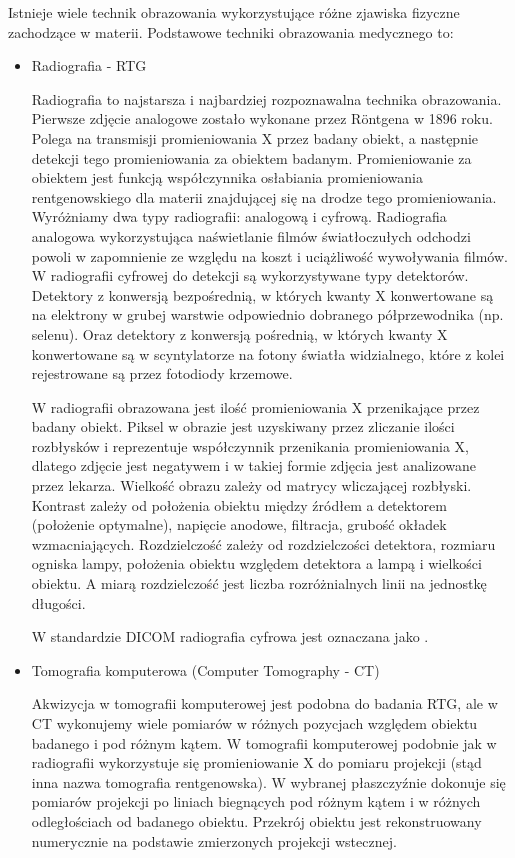 Istnieje wiele technik obrazowania wykorzystujące różne zjawiska fizyczne zachodzące w materii.
Podstawowe techniki obrazowania medycznego to:
\label{sec:basic-imaging-technics}
\begin{itemize}
    \item Radiografia - RTG

          Radiografia to najstarsza i najbardziej rozpoznawalna technika obrazowania.
          Pierwsze zdjęcie analogowe zostało wykonane przez Röntgena w 1896 roku.
          Polega na transmisji promieniowania X przez badany obiekt, a następnie detekcji tego promieniowania za obiektem badanym.
          Promieniowanie za obiektem jest funkcją współczynnika osłabiania promieniowania rentgenowskiego dla materii znajdującej się na drodze tego promieniowania.
          Wyróżniamy dwa typy radiografii: analogową i cyfrową.
          Radiografia analogowa wykorzystująca naświetlanie filmów światłoczułych odchodzi powoli w zapomnienie ze względu na koszt i uciążliwość wywoływania filmów.
          W radiografii cyfrowej do detekcji są wykorzystywane typy detektorów.
          Detektory z konwersją bezpośrednią, w których kwanty X konwertowane są na elektrony w grubej warstwie odpowiednio dobranego półprzewodnika (np. selenu).
          Oraz detektory z konwersją pośrednią, w których kwanty X konwertowane są w scyntylatorze na fotony światła widzialnego, które z kolei rejestrowane są przez fotodiody krzemowe.

          W radiografii obrazowana jest ilość promieniowania X przenikające przez badany obiekt.
          Piksel w obrazie jest uzyskiwany przez zliczanie ilości rozbłysków i reprezentuje współczynnik przenikania promieniowania X, dlatego zdjęcie jest negatywem i w takiej formie zdjęcia jest analizowane przez lekarza.
          Wielkość obrazu zależy od matrycy wliczającej rozbłyski.
          Kontrast zależy od położenia obiektu między źródłem a detektorem (położenie optymalne), napięcie anodowe, filtracja, grubość okładek wzmacniających.
          Rozdzielczość zależy od rozdzielczości detektora, rozmiaru ogniska lampy, położenia obiektu względem detektora a lampą i wielkości obiektu.
          A miarą rozdzielczość jest liczba rozróżnialnych linii na jednostkę długości.

          W standardzie DICOM radiografia cyfrowa jest oznaczana jako .

    \item Tomografia komputerowa (Computer Tomography - CT)

          Akwizycja w tomografii komputerowej jest podobna do badania RTG, ale w CT wykonujemy wiele pomiarów w różnych pozycjach względem obiektu badanego i pod różnym kątem.
          W tomografii komputerowej podobnie jak w radiografii wykorzystuje się promieniowanie X do pomiaru projekcji (stąd inna nazwa tomografia rentgenowska).
          W wybranej płaszczyźnie dokonuje się pomiarów projekcji po liniach biegnących pod różnym kątem i w różnych odległościach od badanego obiektu.
          Przekrój obiektu jest rekonstruowany numerycznie na podstawie zmierzonych projekcji wstecznej.


\end{itemize}
